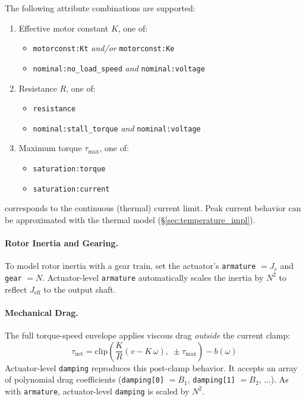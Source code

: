 \documentclass[10pt, a4paper, twocolumn]{article}
\let\oldtexttt\texttt
\renewcommand{\texttt}[1]{{\smaller\oldtexttt{#1}}}
\newcommand{\atR}{\texttt{resistance}}
\newcommand{\atKt}{\texttt{motorconst:Kt}}
\newcommand{\atKe}{\texttt{motorconst:Ke}}
\newcommand{\atVM}{\texttt{nominal:voltage}}
\newcommand{\atSTALL}{\texttt{nominal:stall\_torque}}
\newcommand{\atNLS}{\texttt{nominal:no\_load\_speed}}
\newcommand{\atTMAX}{\texttt{saturation:torque}}
\newcommand{\atIMAX}{\texttt{saturation:current}}
\begin{document}
\pagebreak
\noindent The following attribute combinations are supported:
\begin{enumerate}[itemsep=2pt, parsep=0pt, topsep=2pt]
  \item Effective motor constant $K$, one of:
    \begin{itemize}[itemsep=1pt, parsep=0pt, topsep=1pt]
      \item \atKt{} \emph{and/or} \atKe{}
      \item \atNLS{} \emph{and} \atVM{}
    \end{itemize}
  \item Resistance $R$, one of:
    \begin{itemize}[itemsep=1pt, parsep=0pt, topsep=1pt]
      \item \atR{}
      \item \atSTALL{} \emph{and} \atVM{}
    \end{itemize}
  \item Maximum torque $\tau_{\max}$, one of:
    \begin{itemize}[itemsep=1pt, parsep=0pt, topsep=1pt]
      \item \atTMAX{}
      \item \atIMAX{}
    \end{itemize}
\end{enumerate}

\noindent \atIMAX{} corresponds to the continuous (thermal) current limit. Peak current behavior can be approximated with the thermal model (\S\ref{sec:temperature_impl}).

\paragraph{Rotor Inertia and Gearing.} To model rotor inertia with a gear train, set the actuator's \texttt{armature} $= J_r$ and \texttt{gear} $= N$. Actuator-level \texttt{armature} automatically scales the inertia by $N^2$ to reflect $J_{\text{eff}}$ to the output shaft.

\paragraph{Mechanical Drag.} The full torque-speed envelope applies viscous drag \emph{outside} the current clamp:
\begin{equation*}
  \tau_{\text{net}} = \text{clip}\!\left( \frac{K}{R}(v - K \, \omega),\;
    \pm \tau_{\max} \right) - b(\omega)
  \label{eq:drag}
\end{equation*}
Actuator-level \texttt{damping} reproduces this post-clamp behavior. It accepts an array of polynomial drag coefficients (\texttt{damping[0]} $= B_1$, \texttt{damping[1]} $= B_2$, $\dots$). As with \texttt{armature}, actuator-level \texttt{damping} is scaled by $N^2$.
\end{document}
